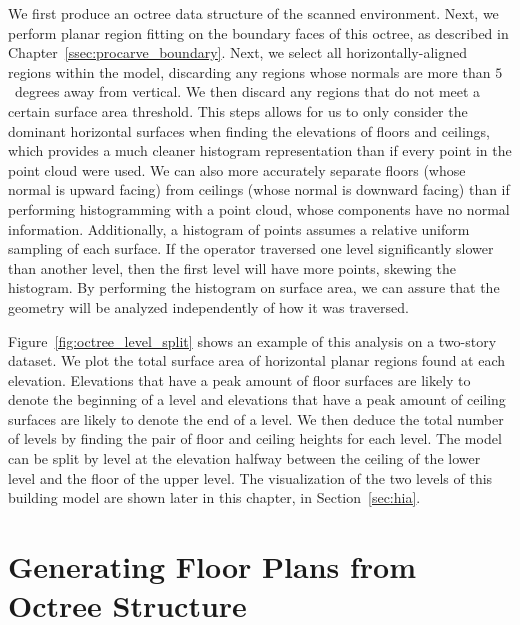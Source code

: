 \documentclass[12pt,onecolumn,oneside]{book}
\begin{document}
We first produce an octree data structure of the scanned environment.  Next, we perform planar region fitting on the boundary faces of this octree, as described in Chapter~\ref{ssec:procarve_boundary}.  Next, we select all horizontally-aligned regions within the model, discarding any regions whose normals are more than $5$~degrees away from vertical.  We then discard any regions that do not meet a certain surface area threshold.  This steps allows for us to only consider the dominant horizontal surfaces when finding the elevations of floors and ceilings, which provides a much cleaner histogram representation than if every point in the point cloud were used.  We can also more accurately separate floors (whose normal is upward facing) from ceilings (whose normal is downward facing) than if performing histogramming with a point cloud, whose components have no normal information.  Additionally, a histogram of points assumes a relative uniform sampling of each surface.  If the operator traversed one level significantly slower than another level, then the first level will have more points, skewing the histogram.  By performing the histogram on surface area, we can assure that the geometry will be analyzed independently of how it was traversed.

Figure~\ref{fig:octree_level_split} shows an example of this analysis on a two-story dataset.  We plot the total surface area of horizontal planar regions found at each elevation.  Elevations that have a peak amount of floor surfaces are likely to denote the beginning of a level and elevations that have a peak amount of ceiling surfaces are likely to denote the end of a level.  We then deduce the total number of levels by finding the pair of floor and ceiling heights for each level.  The model can be split by level at the elevation halfway between the ceiling of the lower level and the floor of the upper level.  The visualization of the two levels of this building model are shown later in this chapter, in Section~\ref{sec:hia}.

\section{Generating Floor Plans from Octree Structure}
\label{sec:oct2fp}
\end{document}
